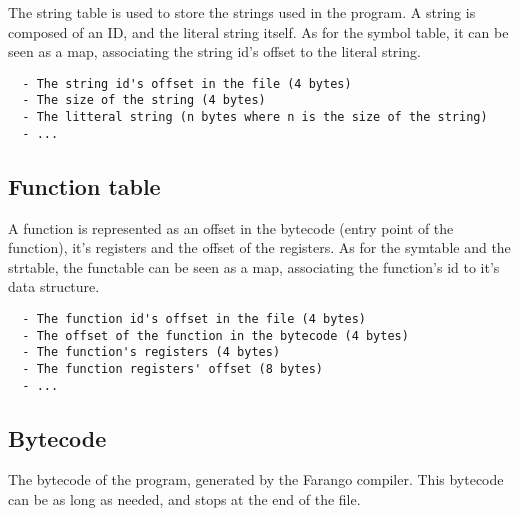 \documentclass[11pt,a4paper]{article}
\begin{document}
The string table is used to store the strings used in the program. A string
is composed of an ID, and the literal string itself. As for the symbol table,
it can be seen as a map, associating the string id's offset to the literal
string.

\begin{verbatim}
  - The string id's offset in the file (4 bytes)
  - The size of the string (4 bytes)
  - The litteral string (n bytes where n is the size of the string)
  - ...
\end{verbatim}

\subsection{Function table}

A function is represented as an offset in the bytecode (entry point of the
function), it's registers and the offset of the registers. As for the symtable
and the strtable, the functable can be seen as a map, associating the function's
id to it's data structure.

\begin{verbatim}
  - The function id's offset in the file (4 bytes)
  - The offset of the function in the bytecode (4 bytes)
  - The function's registers (4 bytes)
  - The function registers' offset (8 bytes)
  - ...
\end{verbatim}

\subsection{Bytecode}

The bytecode of the program, generated by the Farango compiler. This bytecode
can be as long as needed, and stops at the end of the file.
\end{document}
